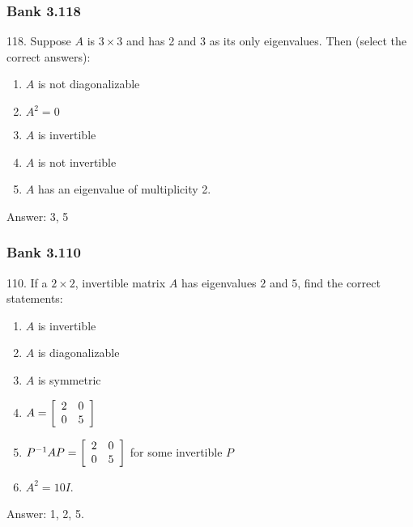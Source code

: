 \documentclass[pdf,9pt,t]{beamer}
\begin{document}
\begin{frame}[fragile]
    \frametitle{Bank 3.118}
    \begin{problem}
	118. Suppose $A$ is $3\times3$ and has 2 and 3 as its only eigenvalues. Then
	    (select the correct answers):
	\begin{enumerate}
	    \item $A$ is not diagonalizable
	    \item $A^{2}=0$
	    \item $A$ is invertible
	    \item $A$ is not invertible
	    \item $A$ has an eigenvalue of multiplicity 2.
	\end{enumerate}
    \end{problem}
    \pause
    Answer: 3, 5
\end{frame}

\begin{frame}[fragile]
    \frametitle{Bank 3.110}
    \begin{problem}
	110. If a $2\times2$, invertible matrix $A$ has eigenvalues $2$ and $5$,
	    find the correct statements:
	\begin{enumerate}
	    \item $A$ is invertible
	    \item $A$ is diagonalizable
	    \item $A$ is symmetric
	    \item $A=\left[
		\begin{array}[c]{cc}
		    2 &  0\\
		    0 &  5
		\end{array}
		\right]$
	    \item $P^{-1}AP=\left[
		\begin{array}[c]{cc}
		    2 &  0\\
		    0 &  5
		\end{array}
		\right]$ for some invertible $P$
	    \item $A^{2}=10I$.
	\end{enumerate}
    \end{problem}
    \pause
    Answer: 1, 2, 5.
\end{frame}
\end{document}
